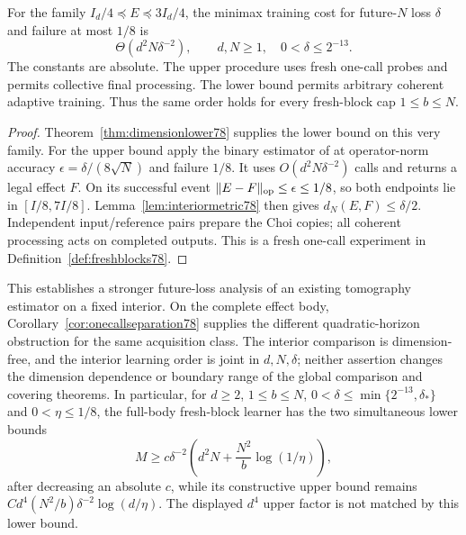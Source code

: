 \begin{theorem}
\label{thm:interiorlearning78}
For the family $I_d/4\preceq E\preceq3I_d/4$, the minimax
training cost for future-$N$ loss $\delta$ and failure at most
$1/8$ is
\begin{equation}\label{eq:interiorlearning78}
 \Theta(d^2N\delta^{-2}),
 \qquad d,N\ge1,\quad0<\delta\le2^{-13}.
\end{equation}
The constants are absolute.  The upper procedure uses fresh
one-call probes and permits collective final processing.  The lower
bound permits arbitrary coherent adaptive training.  Thus the same
order holds for every fresh-block cap $1\le b\le N$.
\end{theorem}
\begin{proof}
Theorem~\ref{thm:dimensionlower78} supplies the lower bound on
this very family.  For the upper bound apply the binary estimator
of \cite[Corollary~III.9]{MB67} at operator-norm accuracy
$\epsilon=\delta/(8\sqrt N)$ and failure $1/8$.
It uses $O(d^2N\delta^{-2})$ calls and returns a legal effect $F$.
On its successful event $\|E-F\|_{\rm op}\le\epsilon\le1/8$,
so both endpoints lie in $[I/8,7I/8]$.
Lemma~\ref{lem:interiormetric78} then gives $d_N(E,F)\le\delta/2$.
Independent input/reference pairs prepare the Choi copies; all
coherent processing acts on completed outputs.  This is a fresh
one-call experiment in Definition~\ref{def:freshblocks78}.
\end{proof}

This establishes a stronger future-loss analysis of an existing
tomography estimator on a fixed interior.  On the complete effect
body, Corollary~\ref{cor:onecallseparation78} supplies the different
quadratic-horizon obstruction for the same acquisition class.
The interior comparison is dimension-free, and the interior learning
order is joint in $d,N,\delta$; neither assertion changes the
dimension dependence or boundary range of the global comparison
and covering theorems.  In particular, for $d\ge2$, $1\le b\le N$,
$0<\delta\le\min\{2^{-13},\delta_*\}$ and $0<\eta\le1/8$,
the full-body fresh-block learner has the two simultaneous lower bounds
\[
 M\ge c\delta^{-2}
       \left(d^2N+\frac{N^2}{b}\log(1/\eta)\right),
\]
after decreasing an absolute $c$, while its constructive upper
bound remains $Cd^4(N^2/b)\delta^{-2}\log(d/\eta)$.
The displayed $d^4$ upper factor is not matched by this lower bound.
